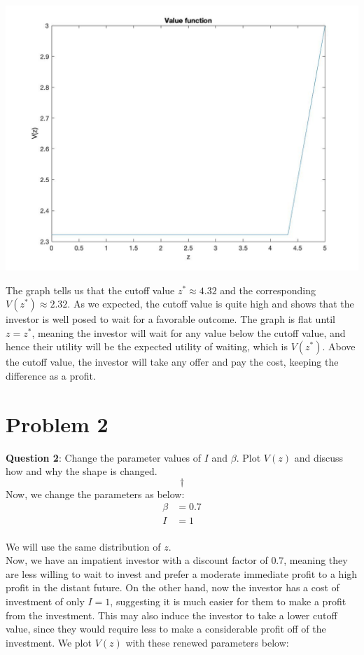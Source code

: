 \documentclass[
]{article}
\begin{document}
\includegraphics{images/valfunc1.jpg}

The graph tells us that the cutoff value \(z^* \approx 4.32\) and the
corresponding \(V(z^*) \approx 2.32\). As we expected, the cutoff value
is quite high and shows that the investor is well posed to wait for a
favorable outcome. The graph is flat until \(z = z^*\), meaning the
investor will wait for any value below the cutoff value, and hence their
utility will be the expected utility of waiting, which is \(V(z^*)\).
Above the cutoff value, the investor will take any offer and pay the
cost, keeping the difference as a profit.

\hypertarget{problem-2}{%
\section{Problem 2}\label{problem-2}}

\textbf{Question 2}: Change the parameter values of \(I\) and \(\beta\).
Plot \(V (z)\) and discuss how and why the shape is changed. \[\dagger\]
Now, we change the parameters as below: \[
\begin{aligned}
\beta &= 0.7 \\
I &= 1 \\
\end{aligned}
\]

We will use the same distribution of \(z\).\\
Now, we have an impatient investor with a discount factor of \(0.7\),
meaning they are less willing to wait to invest and prefer a moderate
immediate profit to a high profit in the distant future. On the other
hand, now the investor has a cost of investment of only \(I = 1\),
suggesting it is much easier for them to make a profit from the
investment. This may also induce the investor to take a lower cutoff
value, since they would require less to make a considerable profit off
of the investment. We plot \(V(z)\) with these renewed parameters below:
\end{document}
